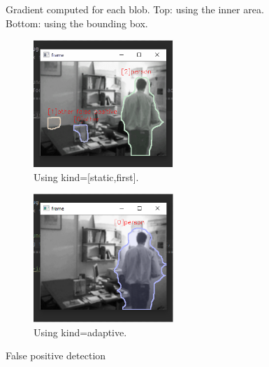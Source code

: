 \documentclass{article}
\begin{document}
\begin{figure}
    \caption{Gradient computed for each blob. Top: using the inner area. Bottom: using the bounding box.}
    \label{grad}
\end{figure}

\begin{figure}[ht]
    \centering
    \begin{subfigure}{0.47\textwidth}
        \centering
        \includegraphics[width=150pt,keepaspectratio]{background_static_falsepositive.PNG}
        \caption{Using kind=[static,first].}
        \label{Figure:fpl}
    \end{subfigure}
    \begin{subfigure}{0.47\textwidth}
        \centering
        \includegraphics[width=150pt,keepaspectratio]{background_adaptive_falsepositive.PNG}
        \caption{Using kind=adaptive.}
        \label{Figure:fpi}
    \end{subfigure}
    \caption{False positive detection}

\end{figure}
\end{document}
